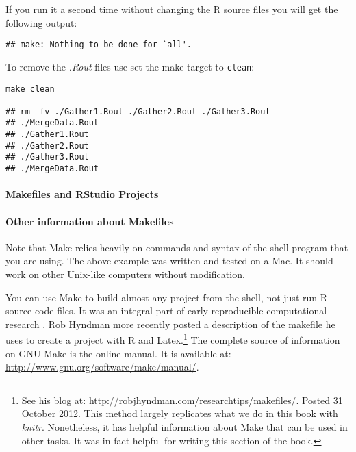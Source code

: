 \noindent If you run it a second time without changing the R source files you will get the following output:

\begin{knitrout}
	\color{fgcolor}
	\begin{kframe}
		\begin{verbatim}
## make: Nothing to be done for `all'.
			\end{verbatim}
		\end{kframe}
\end{knitrout}

\noindent To remove the \emph{.Rout} files use set the make target to \texttt{clean}:

\begin{knitrout}
	\color{fgcolor}
	\begin{kframe}
		\begin{verbatim}
make clean

## rm -fv ./Gather1.Rout ./Gather2.Rout ./Gather3.Rout 
## ./MergeData.Rout
## ./Gather1.Rout
## ./Gather2.Rout
## ./Gather3.Rout
## ./MergeData.Rout
			\end{verbatim}
		\end{kframe}
\end{knitrout}

\paragraph{Makefiles and RStudio Projects}


\paragraph{Other information about Makefiles}

Note that Make relies heavily on commands and syntax of the shell program that you are using. The above example was written and tested on a Mac. It should work on other Unix-like computers without modification.

You can use Make to build almost any project from the shell, not just run R source code files. It was an integral part of early reproducible computational research \citep{Fomel2009, Buckheit1995}. Rob Hyndman more recently posted a description of the makefile he uses to create a project with R and Latex.\footnote{See his blog at: \url{http://robjhyndman.com/researchtips/makefiles/}. Posted 31 October 2012. This method largely replicates what we do in this book with \emph{knitr}. Nonetheless, it has helpful information about Make that can be used in other tasks. It was in fact helpful for writing this section of the book.} The complete source of information on GNU Make is the online manual. It is available at: \url{http://www.gnu.org/software/make/manual/}.

